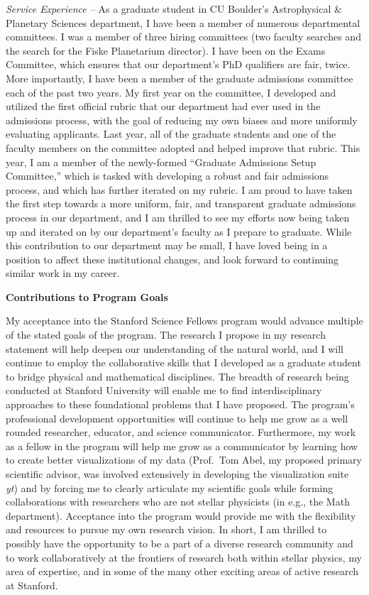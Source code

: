 \documentclass[onecolumn, 11pt, hmargin=1in, vmargin=1in]{aastex62}
\begin{document}
\emph{Service Experience --}
As a graduate student in CU Boulder's Astrophysical \& Planetary Sciences department, I have been a member of numerous departmental committees.
I was a member of three hiring committees (two faculty searches and the search for the Fiske Planetarium director).
I have been on the Exams Committee, which ensures that our department's PhD qualifiers are fair, twice.
More importantly, I have been a member of the graduate admissions committee each of the past two years.
My first year on the committee, I developed and utilized the first official rubric that our department had ever used in the admissions process, with the goal of reducing my own biases and more uniformly evaluating applicants.
Last year, all of the graduate students and one of the faculty members on the committee adopted and helped improve that rubric.
This year, I am a member of the newly-formed ``Graduate Admissions Setup Committee,'' which is tasked with developing a robust and fair admissions process, and which has further iterated on my rubric.
I am proud to have taken the first step towards a more uniform, fair, and transparent graduate admissions process in our department, and I am thrilled to see my efforts now being taken up and iterated on by our department's faculty as I prepare to graduate.
While this contribution to our department may be small, I have loved being in a position to affect these institutional changes, and look forward to continuing similar work in my career.


\begin{center}
\textbf{Contributions to Program Goals}
\vspace{-6pt}
\end{center}

My acceptance into the Stanford Science Fellows program would advance multiple of the stated goals of the program.
The research I propose in my research statement will help deepen our understanding of the natural world, and I will continue to employ the collaborative skills that I developed as a graduate student to bridge physical and mathematical disciplines.
The breadth of research being conducted at Stanford University will enable me to find interdisciplinary approaches to these foundational problems that I have proposed.
The program's professional development opportunities will continue to help me grow as a well rounded researcher, educator, and science communicator.
Furthermore, my work as a fellow in the program will help me grow as a communicator by learning how to create better visualizations of my data (Prof.~Tom Abel, my proposed primary scientific advisor, was involved extensively in developing the visualization suite \emph{yt}) and by forcing me to clearly articulate my scientific goals while forming collaborations with researchers who are not stellar physicists (in e.g., the Math department). 
Acceptance into the program would provide me with the flexibility and resources to pursue my own research vision.
In short, I am thrilled to possibly have the opportunity to be a part of a diverse research community and to work collaboratively at the frontiers of research both within stellar physics, my area of expertise, and in some of the many other exciting areas of active research at Stanford.



\end{document}
